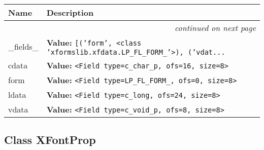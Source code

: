     \vspace{-1cm}
\hspace{\varindent}\begin{longtable}{|p{\varnamewidth}|p{\vardescrwidth}|l}
\cline{1-2}
\cline{1-2} \centering \textbf{Name} & \centering \textbf{Description}& \\
\cline{1-2}
\endhead\cline{1-2}\multicolumn{3}{r}{\small\textit{continued on next page}}\\\endfoot\cline{1-2}
\endlastfoot\raggedright \_\-f\-i\-e\-l\-d\-s\-\_\- & \raggedright \textbf{Value:} 
{\tt \texttt{[}\texttt{(}\texttt{'}\texttt{form}\texttt{'}\texttt{, }{\textless}class 'xformslib.xfdata.LP\_FL\_FORM\_'{\textgreater}\texttt{)}\texttt{, }\texttt{(}\texttt{'}\texttt{vdat}\texttt{...}}&\\
\cline{1-2}
\raggedright c\-d\-a\-t\-a\- & \raggedright \textbf{Value:} 
{\tt {\textless}Field type=c\_char\_p, ofs=16, size=8{\textgreater}}&\\
\cline{1-2}
\raggedright f\-o\-r\-m\- & \raggedright \textbf{Value:} 
{\tt {\textless}Field type=LP\_FL\_FORM\_, ofs=0, size=8{\textgreater}}&\\
\cline{1-2}
\raggedright l\-d\-a\-t\-a\- & \raggedright \textbf{Value:} 
{\tt {\textless}Field type=c\_long, ofs=24, size=8{\textgreater}}&\\
\cline{1-2}
\raggedright v\-d\-a\-t\-a\- & \raggedright \textbf{Value:} 
{\tt {\textless}Field type=c\_void\_p, ofs=8, size=8{\textgreater}}&\\
\cline{1-2}
\end{longtable}



\subsection{Class XFontProp}


